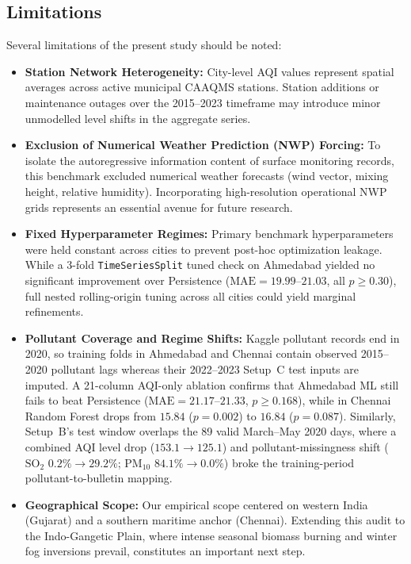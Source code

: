 \subsection{Limitations}
\label{sec:limitations}
Several limitations of the present study should be noted:
\begin{itemize}
  \item \textbf{Station Network Heterogeneity:} City-level AQI values represent spatial averages across active municipal CAAQMS stations. Station additions or maintenance outages over the 2015--2023 timeframe may introduce minor unmodelled level shifts in the aggregate series.
  \item \textbf{Exclusion of Numerical Weather Prediction (NWP) Forcing:} To isolate the autoregressive information content of surface monitoring records, this benchmark excluded numerical weather forecasts (wind vector, mixing height, relative humidity). Incorporating high-resolution operational NWP grids represents an essential avenue for future research.
  \item \textbf{Fixed Hyperparameter Regimes:} Primary benchmark hyperparameters were held constant across cities to prevent post-hoc optimization leakage. While a 3-fold \texttt{TimeSeriesSplit} tuned check on Ahmedabad yielded no significant improvement over Persistence ($\text{MAE} = 19.99\text{--}21.03$, all $p \ge 0.30$), full nested rolling-origin tuning across all cities could yield marginal refinements.
  \item \textbf{Pollutant Coverage and Regime Shifts:} Kaggle pollutant records end in 2020, so training folds in Ahmedabad and Chennai contain observed 2015--2020 pollutant lags whereas their 2022--2023 Setup~C test inputs are imputed. A 21-column AQI-only ablation confirms that Ahmedabad ML still fails to beat Persistence ($\text{MAE} = 21.17\text{--}21.33$, $p \ge 0.168$), while in Chennai Random Forest drops from $15.84$ ($p = 0.002$) to $16.84$ ($p = 0.087$). Similarly, Setup~B's test window overlaps the 89 valid March--May 2020 days, where a combined AQI level drop ($153.1 \rightarrow 125.1$) and pollutant-missingness shift ($\text{SO}_2$ $0.2\% \rightarrow 29.2\%$; $\text{PM}_{10}$ $84.1\% \rightarrow 0.0\%$) broke the training-period pollutant-to-bulletin mapping.
  \item \textbf{Geographical Scope:} Our empirical scope centered on western India (Gujarat) and a southern maritime anchor (Chennai). Extending this audit to the Indo-Gangetic Plain, where intense seasonal biomass burning and winter fog inversions prevail, constitutes an important next step.
\end{itemize}

